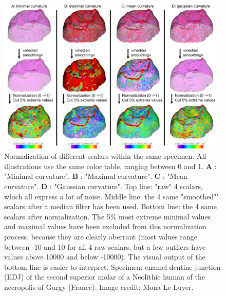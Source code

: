 \begin{figure}
  \centering
  \includegraphics[scale=0.26]{images/11/normalization_example.jpg} 
	\caption{ 
Normalization of different scalars within the same specimen. All illustrations use the same color table, ranging between 0 and 1.  \textbf{A} : "Minimal curvature".  \textbf{B} : "Maximal curvature". \textbf{C} : "Mean curvature". \textbf{D} : "Gaussian curvature". Top line: "raw" 4 scalars, which all express a lot of noise. Middle line: the 4 same "smoothed"' scalars after a median filter has been used. Bottom line: the 4 same scalars after normalization. The 5\% most extreme minimal values and maximal values have been excluded from this normalization process, because they are clearly aberrant (most values range between -10 and 10 for all 4 raw scalars, but a few outliers have values above 10000 and below -10000). The visual output of the bottom line is easier to interpret. Specimen: enamel dentine junction (EDJ) of the second superior molar of a  Neolithic human of the necropolis of Gurgy (France). Image credit: Mona Le Luyer.	
	}
\label{normalization_example}
\end{figure}

